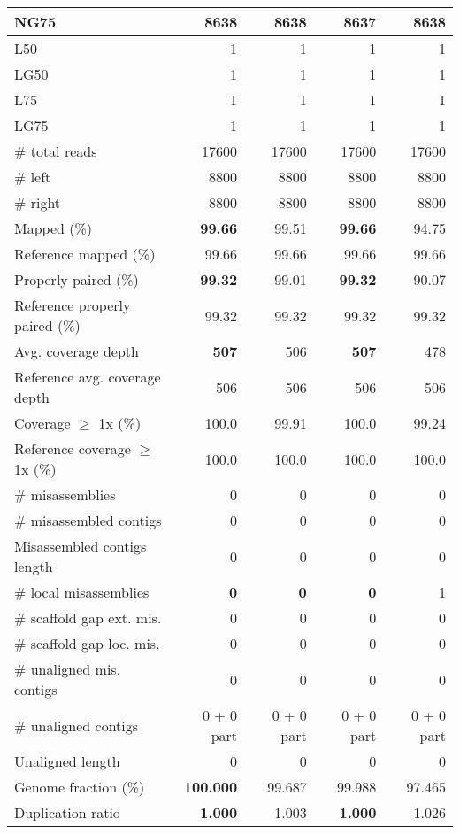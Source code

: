 \documentclass[12pt,a4paper]{article}
\begin{document}
\begin{table}[ht]
\begin{center}
\begin{tabular}{|l*{4}{|r}|}
NG75 & {\bf 8638} & {\bf 8638} & 8637 & {\bf 8638} \\ \hline
L50 & 1 & 1 & 1 & 1 \\ \hline
LG50 & 1 & 1 & 1 & 1 \\ \hline
L75 & 1 & 1 & 1 & 1 \\ \hline
LG75 & 1 & 1 & 1 & 1 \\ \hline
\# total reads & 17600 & 17600 & 17600 & 17600 \\ \hline
\# left & 8800 & 8800 & 8800 & 8800 \\ \hline
\# right & 8800 & 8800 & 8800 & 8800 \\ \hline
Mapped (\%) & {\bf 99.66} & 99.51 & {\bf 99.66} & 94.75 \\ \hline
Reference mapped (\%) & 99.66 & 99.66 & 99.66 & 99.66 \\ \hline
Properly paired (\%) & {\bf 99.32} & 99.01 & {\bf 99.32} & 90.07 \\ \hline
Reference properly paired (\%) & 99.32 & 99.32 & 99.32 & 99.32 \\ \hline
Avg. coverage depth & {\bf 507} & 506 & {\bf 507} & 478 \\ \hline
Reference avg. coverage depth & 506 & 506 & 506 & 506 \\ \hline
Coverage $\geq$ 1x (\%) & 100.0 & 99.91 & 100.0 & 99.24 \\ \hline
Reference coverage $\geq$ 1x (\%) & 100.0 & 100.0 & 100.0 & 100.0 \\ \hline
\# misassemblies & 0 & 0 & 0 & 0 \\ \hline
\# misassembled contigs & 0 & 0 & 0 & 0 \\ \hline
Misassembled contigs length & 0 & 0 & 0 & 0 \\ \hline
\# local misassemblies & {\bf 0} & {\bf 0} & {\bf 0} & 1 \\ \hline
\# scaffold gap ext. mis. & 0 & 0 & 0 & 0 \\ \hline
\# scaffold gap loc. mis. & 0 & 0 & 0 & 0 \\ \hline
\# unaligned mis. contigs & 0 & 0 & 0 & 0 \\ \hline
\# unaligned contigs & 0 + 0 part & 0 + 0 part & 0 + 0 part & 0 + 0 part \\ \hline
Unaligned length & 0 & 0 & 0 & 0 \\ \hline
Genome fraction (\%) & {\bf 100.000} & 99.687 & 99.988 & 97.465 \\ \hline
Duplication ratio & {\bf 1.000} & 1.003 & {\bf 1.000} & 1.026 \\ \hline

\end{tabular}
\end{center}
\end{table}
\end{document}
